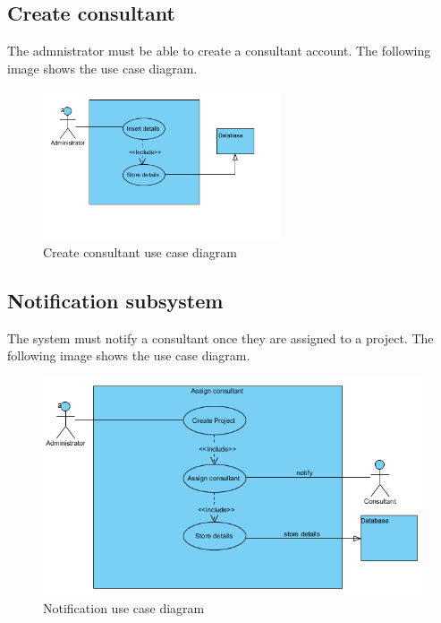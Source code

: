 \documentclass[a4paper, 12pt, oneside]{article}
\begin{document}
\subsection{Create consultant}
The admnistrator must be able to create a consultant account. The following image shows the use case diagram.
\begin{figure}[h!]
\includegraphics[width = 70mm, scale = 0.8]{images/createConsultant.png}
	\caption{Create consultant use case diagram}
\end{figure}

\subsection{Notification subsystem}
The system must notify a consultant once they are assigned to a project. The following image shows the use case diagram.
\begin{figure}[h!]
\includegraphics[width = \linewidth]{images/notificationSubsystem.png}
	\caption{Notification use case diagram}
\end{figure}
\end{document}

